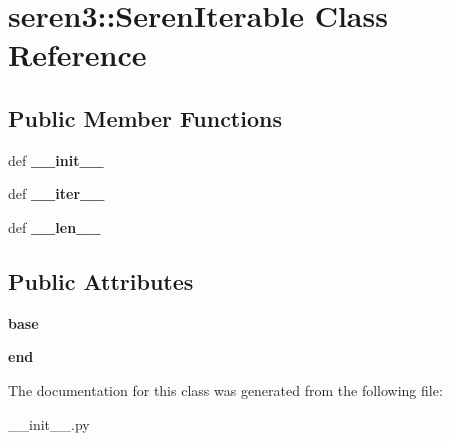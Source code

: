 \hypertarget{classseren3_1_1SerenIterable}{
\section{seren3::SerenIterable Class Reference}
\label{classseren3_1_1SerenIterable}
}
\subsection*{Public Member Functions}
\begin{DoxyCompactItemize}
\item 
\hypertarget{classseren3_1_1SerenIterable_ac7c43d6e8226ad78c9048a0e65b52833}{
def {\bfseries \_\-\_\-init\_\-\_\-}}
\label{classseren3_1_1SerenIterable_ac7c43d6e8226ad78c9048a0e65b52833}

\item 
\hypertarget{classseren3_1_1SerenIterable_a91a1c3e2a658d2d57ba4193dbbcff967}{
def {\bfseries \_\-\_\-iter\_\-\_\-}}
\label{classseren3_1_1SerenIterable_a91a1c3e2a658d2d57ba4193dbbcff967}

\item 
\hypertarget{classseren3_1_1SerenIterable_a79713bd9eb60fc50e54181fdb7826e08}{
def {\bfseries \_\-\_\-len\_\-\_\-}}
\label{classseren3_1_1SerenIterable_a79713bd9eb60fc50e54181fdb7826e08}

\end{DoxyCompactItemize}
\subsection*{Public Attributes}
\begin{DoxyCompactItemize}
\item 
\hypertarget{classseren3_1_1SerenIterable_ace06fe898c6234c84bba67636db36011}{
{\bfseries base}}
\label{classseren3_1_1SerenIterable_ace06fe898c6234c84bba67636db36011}

\item 
\hypertarget{classseren3_1_1SerenIterable_a03f4e823a3a56f513c2bc6082864581e}{
{\bfseries end}}
\label{classseren3_1_1SerenIterable_a03f4e823a3a56f513c2bc6082864581e}

\end{DoxyCompactItemize}


The documentation for this class was generated from the following file:\begin{DoxyCompactItemize}
\item 
\_\-\_\-init\_\-\_\-.py\end{DoxyCompactItemize}
